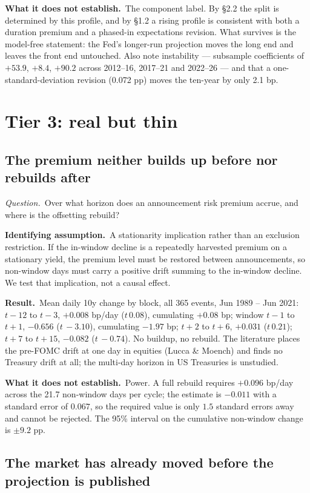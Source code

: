 \documentclass[11pt]{article}
\newcommand{\qq}[1]{\vspace{0.3em}\noindent\textit{Question.}\ #1}
\newcommand{\ia}[1]{\vspace{0.4em}\noindent\textbf{Identifying assumption.}\ #1}
\newcommand{\res}[1]{\vspace{0.4em}\noindent\textbf{Result.}\ #1}
\newcommand{\limn}[1]{\vspace{0.4em}\noindent\textbf{What it does not establish.}\ #1}
\begin{document}
\limn{The component label. By \S2.2 the split is determined by this profile, and by \S1.2 a rising profile is consistent with both a duration premium and a phased-in expectations revision. What survives is the model-free statement: the Fed's longer-run projection moves the long end and leaves the front end untouched. Also note instability --- subsample coefficients of $+53.9$, $+8.4$, $+90.2$ across 2012--16, 2017--21 and 2022--26 --- and that a one-standard-deviation revision (0.072 pp) moves the ten-year by only 2.1 bp.}

\section{Tier 3: real but thin}

\subsection{The premium neither builds up before nor rebuilds after}

\qq{Over what horizon does an announcement risk premium accrue, and where is the offsetting rebuild?}

\ia{A stationarity implication rather than an exclusion restriction. If the in-window decline is a repeatedly harvested premium on a stationary yield, the premium level must be restored between announcements, so non-window days must carry a positive drift summing to the in-window decline. We test that implication, not a causal effect.}

\res{Mean daily 10y change by block, all 365 events, Jun 1989 -- Jun 2021: $t\!-\!12$ to $t\!-\!3$, $+0.008$ bp/day ($t\,0.08$), cumulating $+0.08$ bp; window $t\!-\!1$ to $t\!+\!1$, $-0.656$ ($t\,{-}3.10$), cumulating $-1.97$ bp; $t\!+\!2$ to $t\!+\!6$, $+0.031$ ($t\,0.21$); $t\!+\!7$ to $t\!+\!15$, $-0.082$ ($t\,{-}0.74$). No buildup, no rebuild. The literature places the pre-FOMC drift at one day in equities (Lucca \& Moench) and finds no Treasury drift at all; the multi-day horizon in US Treasuries is unstudied.}

\limn{Power. A full rebuild requires $+0.096$ bp/day across the 21.7 non-window days per cycle; the estimate is $-0.011$ with a standard error of $0.067$, so the required value is only $1.5$ standard errors away and cannot be rejected. The 95\% interval on the cumulative non-window change is $\pm9.2$ pp.}

\subsection{The market has already moved before the projection is published}
\end{document}
